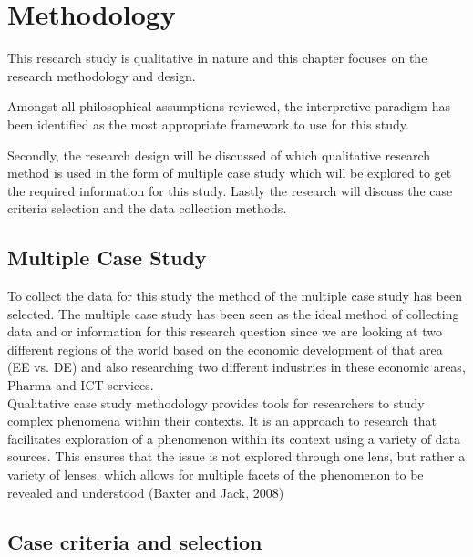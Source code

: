 \chapter{Methodology}

This research study is qualitative in nature and this chapter focuses on the research methodology and design.
 
Amongst all philosophical assumptions reviewed, the interpretive paradigm has been identified as the most appropriate framework to use for this study. 

Secondly, the research design will be discussed of which qualitative research method is used in the form of multiple case study which will be explored to get the required information for this study. Lastly the research will discuss the case criteria selection and the data collection methods.

\section{Multiple Case Study}

To collect the data for this study the method of the multiple case study has been selected. 
The multiple case study has been seen as the ideal method of collecting data and or information for this research question since we are looking at two different regions of the world based on the economic development of that area (\gls{EE} vs. \gls{DE}) and also researching two different industries in these economic areas, Pharma and ICT services.\\

Qualitative case study methodology provides tools for researchers to study complex phenomena within their contexts.
It is an approach to research that facilitates exploration of a phenomenon within its context using a variety of data sources.
This ensures that the issue is not explored through one lens, but rather a variety of lenses, which allows for multiple facets of the phenomenon to be revealed and understood (Baxter and Jack, 2008)

\section{Case criteria and selection}



